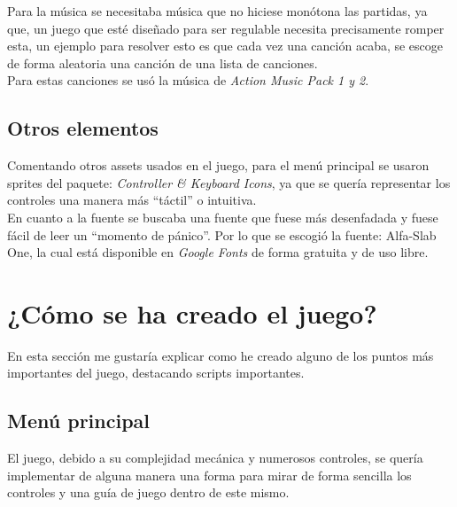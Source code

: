 \documentclass[12pt]{article}
\begin{document}
        Para la música se necesitaba música que no hiciese monótona las partidas, ya que, un juego que esté diseñado para ser regulable necesita precisamente romper esta, un ejemplo para resolver esto es que cada vez una canción acaba, se escoge de forma aleatoria una canción de una lista de canciones.\\
        
        Para estas canciones se usó la música de \textit{Action Music Pack 1 y 2}.\\
        
    \subsection{Otros elementos}
    
        Comentando otros assets usados en el juego, para el menú principal se usaron sprites del paquete: \textit{Controller \& Keyboard Icons}, ya que se quería representar los controles una manera más “táctil” o intuitiva.\\
        
        En cuanto a la fuente se buscaba una fuente que fuese más desenfadada y fuese fácil de leer un “momento de pánico”. Por lo que se escogió la fuente: Alfa-Slab One, la cual está disponible en \textit{Google Fonts} de forma gratuita y de uso libre.\\

\newpage
\section{¿Cómo se ha creado el juego?}
    En esta sección me gustaría explicar como he creado alguno de los puntos más importantes del juego, destacando scripts importantes. \\
    \subsection{Menú principal}
        El juego, debido a su complejidad mecánica y numerosos controles, se quería implementar de alguna manera una forma para mirar de forma sencilla los controles y una guía de juego dentro de este mismo.\\
\end{document}
